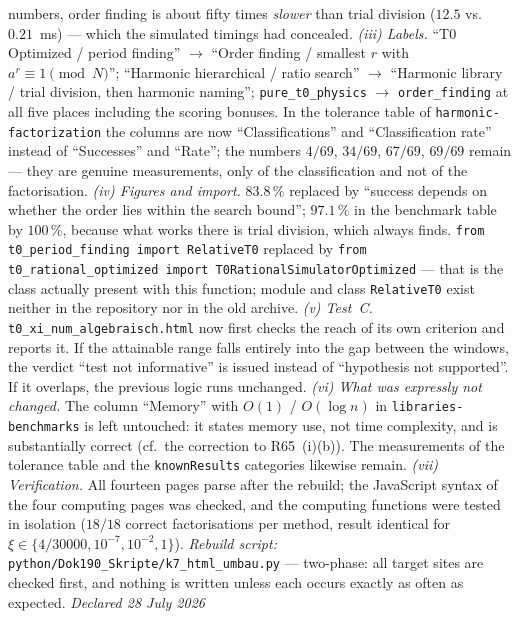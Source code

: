 numbers, order finding is about fifty times \emph{slower} than trial
division ($12.5$ vs.\ $0.21$~ms) --- which the simulated timings had
concealed.
\emph{(iii) Labels.} \enquote{T0 Optimized / period finding} $\to$
\enquote{Order finding / smallest $r$ with $a^r \equiv 1 \pmod N$};
\enquote{Harmonic hierarchical / ratio search} $\to$
\enquote{Harmonic library / trial division, then harmonic naming};
\texttt{pure\_t0\_physics} $\to$ \texttt{order\_finding} at all five
places including the scoring bonuses. In the tolerance table of
\texttt{harmonic-factorization} the columns are now
\enquote{Classifications} and \enquote{Classification rate} instead of
\enquote{Successes} and \enquote{Rate}; the numbers $4/69$, $34/69$,
$67/69$, $69/69$ remain --- they are genuine measurements, only of the
classification and not of the factorisation.
\emph{(iv) Figures and import.} $83.8\,\%$ replaced by \enquote{success
depends on whether the order lies within the search bound};
$97.1\,\%$ in the benchmark table by $100\,\%$, because what works there
is trial division, which always finds.
\texttt{from t0\_period\_finding import RelativeT0} replaced by
\texttt{from t0\_rational\_optimized import T0RationalSimulatorOptimized}
--- that is the class actually present with this function; module and
class \texttt{RelativeT0} exist neither in the repository nor in the old
archive.
\emph{(v) Test~C.} \texttt{t0\_xi\_num\_algebraisch.html} now first
checks the reach of its own criterion and reports it. If the attainable
range falls entirely into the gap between the windows, the verdict
\enquote{test not informative} is issued instead of \enquote{hypothesis
not supported}. If it overlaps, the previous logic runs unchanged.
\emph{(vi) What was expressly not changed.} The column
\enquote{Memory} with $O(1)$ / $O(\log n)$ in
\texttt{libraries-benchmarks} is left untouched: it states memory use,
not time complexity, and is substantially correct (cf.\ the correction
to R65~(i)(b)). The measurements of the tolerance table and the
\texttt{knownResults} categories likewise remain.
\emph{(vii) Verification.} All fourteen pages parse after the rebuild;
the JavaScript syntax of the four computing pages was checked, and the
computing functions were tested in isolation ($18/18$ correct
factorisations per method, result identical for
$\xi \in \{4/30000, 10^{-7}, 10^{-2}, 1\}$).
\emph{Rebuild script:}
\texttt{python/\allowbreak Dok190\_\allowbreak Skripte/\allowbreak k7\_\allowbreak html\_\allowbreak umbau.py}
--- two-phase: all target sites are checked first, and nothing is written
unless each occurs exactly as often as expected.
\emph{Declared 28 July 2026}

